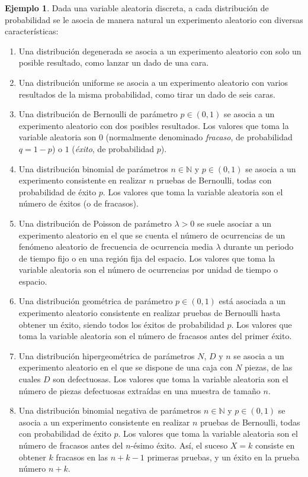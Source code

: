 \documentclass[11pt]{report}
\theoremstyle{definition}
\newtheorem{example}{Ejemplo}
\newcommand{\N}{\mathbb N}
\begin{document}
\begin{example} Dada una variable aleatoria discreta, a cada distribución de probabilidad se le asocia de manera natural un experimento aleatorio con diversas características:
\begin{enumerate}
    \item Una distribución degenerada se asocia a un experimento aleatorio con solo un posible resultado, como lanzar un dado de una cara.
    \item Una distribución uniforme se asocia a un experimento aleatorio con varios resultados de la misma probabilidad, como tirar un dado de seis caras.
    \item Una distribución de Bernoulli de parámetro $p \in (0,1)$ se asocia a un experimento aleatorio con dos posibles resultados. Los valores que toma la variable aleatoria son $0$ (normalmente denominado \emph{fracaso}, de probabilidad $q = 1-p$) o $1$ (\emph{éxito}, de probabilidad $p$).
    \item Una distribución binomial de parámetros $n \in \N$ y $p \in (0,1)$ se asocia a un experimento consistente en realizar $n$ pruebas de Bernoulli, todas con probabilidad de éxito $p$. Los valores que toma la variable aleatoria son el número de éxitos (o de fracasos).
    \item Una distribución de Poisson de parámetro $\lambda >0$ se suele asociar a un experimento aleatorio en el que se cuenta el número de ocurrencias de un fenómeno aleatorio de frecuencia de ocurrencia media $\lambda$ durante un periodo de tiempo fijo o en una región fija del espacio. Los valores que toma la variable aleatoria son el número de ocurrencias por unidad de tiempo o espacio.
    \item Una distribución geométrica de parámetro $p \in (0,1)$ está asociada a un experimento aleatorio consistente en realizar pruebas de Bernoulli hasta obtener un éxito, siendo todos los éxitos de probabilidad $p$. Los valores que toma la variable aleatoria son el número de fracasos antes del primer éxito.
    \item Una distribución hipergeométrica de parámetros $N$, $D$ y $n$ se asocia a un experimento aleatorio en el que se dispone de una caja con $N$ piezas, de las cuales $D$ son defectuosas. Los valores que toma la variable aleatoria son el número de piezas defectuosas extraídas en una muestra de tamaño $n$.
    \item Una distribución binomial negativa de parámetros $n \in \N$ y $p \in (0,1)$ se asocia a un experimento consistente en realizar $n$ pruebas de Bernoulli, todas con probabilidad de éxito $p$. Los valores que toma la variable aleatoria son el número de fracasos antes del $n$-ésimo éxito. Así, el suceso $X = k$ consiste en obtener $k$ fracasos en las $n+k-1$ primeras pruebas, y un éxito en la prueba número $n+k$.
\end{enumerate}
\end{example}
\end{document}

